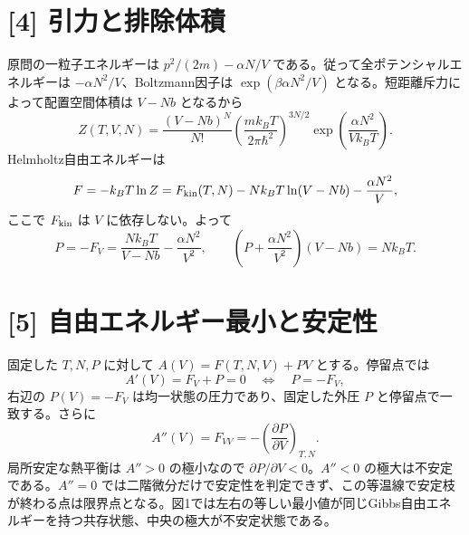 \documentclass[11pt,a4paper]{article}
\begin{document}
\section*{[4] 引力と排除体積}
原問の一粒子エネルギーは $p^2/(2m)-\alpha N/V$ である。従って全ポテンシャルエネルギーは $-\alpha N^2/V$、Boltzmann因子は $\exp(\beta\alpha N^2/V)$ となる。短距離斥力によって配置空間体積は $V-Nb$ となるから
\begin{equation}
 \boxed{Z(T,V,N)=\frac{(V-Nb)^N}{N!}
 \left(\frac{mk_BT}{2\pi\hbar^2}\right)^{3N/2}
 \exp\!\left(\frac{\alpha N^2}{Vk_BT}\right).}
\end{equation}
Helmholtz自由エネルギーは
\begin{equation}
 F=-k_BT\ln Z=F_{\rm kin}(T,N)-Nk_BT\ln(V-Nb)
 -\frac{\alpha N^2}{V},
\end{equation}
ここで $F_{\rm kin}$ は $V$ に依存しない。よって
\begin{equation}
 \boxed{P=-F_V=\frac{Nk_BT}{V-Nb}-\frac{\alpha N^2}{V^2}},\qquad
 \boxed{\left(P+\frac{\alpha N^2}{V^2}\right)(V-Nb)=Nk_BT.}
\end{equation}

\section*{[5] 自由エネルギー最小と安定性}
固定した $T,N,P$ に対して $A(V)=F(T,N,V)+PV$ とする。停留点では
\begin{equation}
 A'(V)=F_V+P=0\quad\Longleftrightarrow\quad P=-F_V,
\end{equation}
右辺の $P(V)=-F_V$ は均一状態の圧力であり、固定した外圧 $P$ と停留点で一致する。さらに
\begin{equation}
 A''(V)=F_{VV}=-\left(\frac{\partial P}{\partial V}\right)_{T,N}.
\end{equation}
局所安定な熱平衡は $A''>0$ の極小なので $\partial P/\partial V<0$。$A''<0$ の極大は不安定である。$A''=0$ では二階微分だけで安定性を判定できず、この等温線で安定枝が終わる点は限界点となる。図1では左右の等しい最小値が同じGibbs自由エネルギーを持つ共存状態、中央の極大が不安定状態である。

\begin{center}
\end{center}
\end{document}
